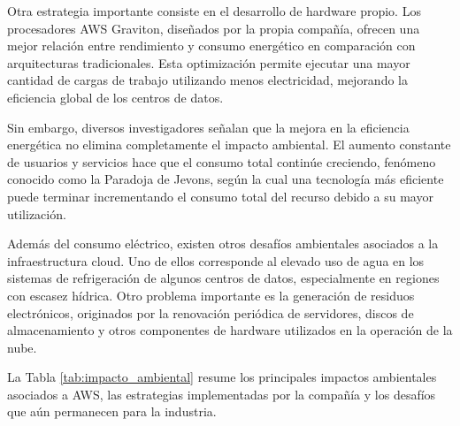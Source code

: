 \documentclass[12pt,a4paper]{article}
\begin{document}
Otra estrategia importante consiste en el desarrollo de hardware propio. Los procesadores AWS Graviton, diseñados por la propia compañía, ofrecen una mejor relación entre rendimiento y consumo energético en comparación con arquitecturas tradicionales. Esta optimización permite ejecutar una mayor cantidad de cargas de trabajo utilizando menos electricidad, mejorando la eficiencia global de los centros de datos.

Sin embargo, diversos investigadores señalan que la mejora en la eficiencia energética no elimina completamente el impacto ambiental. El aumento constante de usuarios y servicios hace que el consumo total continúe creciendo, fenómeno conocido como la Paradoja de Jevons, según la cual una tecnología más eficiente puede terminar incrementando el consumo total del recurso debido a su mayor utilización.\parencite{alcott2005jevons}

Además del consumo eléctrico, existen otros desafíos ambientales asociados a la infraestructura cloud. Uno de ellos corresponde al elevado uso de agua en los sistemas de refrigeración de algunos centros de datos, especialmente en regiones con escasez hídrica. Otro problema importante es la generación de residuos electrónicos, originados por la renovación periódica de servidores, discos de almacenamiento y otros componentes de hardware utilizados en la operación de la nube.

La Tabla \ref{tab:impacto_ambiental} resume los principales impactos ambientales asociados a AWS, las estrategias implementadas por la compañía y los desafíos que aún permanecen para la industria.
\end{document}
